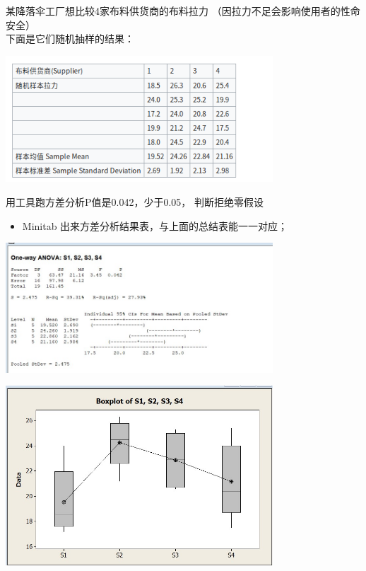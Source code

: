 某降落伞工厂想比较4家布料供货商的布料拉力
（因拉力不足会影响使用者的性命安全）\\
下面是它们随机抽样的结果：


\includegraphics[width=10cm]{Screenshotfrom2022-12-2822-39-42.png}

用工具跑方差分析P值是0.042，少于0.05， 判断拒绝零假设

\begin{itemize}
\tightlist
\item
  Minitab 出来方差分析结果表，与上面的总结表能一一对应；
\end{itemize}


\includegraphics[width=10cm]{AnovaParachutes807Screenshot_2022-08-07_124737.jpg}


\includegraphics[width=10cm]{AnovaBoxplots807.jpg}

